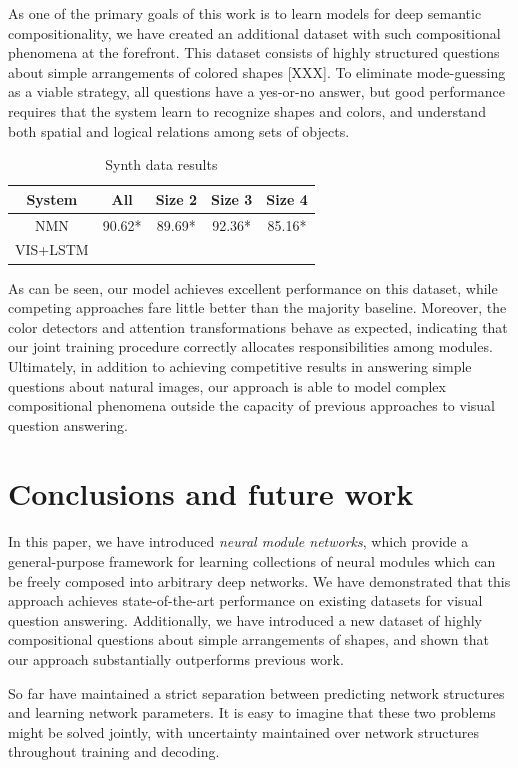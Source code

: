\documentclass[10pt,twocolumn,letterpaper]{article}
\begin{document}
As one of the primary goals of this work is to learn models for deep semantic
compositionality, we have created an additional dataset with such compositional
phenomena at the forefront. This dataset consists of highly structured questions
about simple arrangements of colored shapes [XXX]. To eliminate mode-guessing as
a viable strategy, all questions have a yes-or-no answer, but good performance
requires that the system learn to recognize shapes and colors, and understand
both spatial and logical relations among sets of objects.


\begin{table}[h]
  \footnotesize
  \center
  \begin{tabular}{ccccc}
    \toprule
    System & All & Size 2 & Size 3 & Size 4 \\
    \midrule
    NMN & 90.62* & 89.69* & 92.36* & 85.16* \\
    VIS+LSTM &  \\
    \bottomrule
  \end{tabular}
  \caption{Synth data results}
\end{table}

As can be seen, our model achieves excellent performance on this dataset, while
competing approaches fare little better than the majority baseline. Moreover,
the color detectors and attention transformations behave as expected, indicating
that our joint training procedure correctly allocates responsibilities among
modules. Ultimately, in addition to achieving competitive results in answering
simple questions about natural images, our approach is able to model complex
compositional phenomena outside the capacity of previous approaches to visual
question answering.

\section{Conclusions and future work}

In this paper, we have introduced \emph{neural module networks}, which provide a
general-purpose framework for learning collections of neural modules which can
be freely composed into arbitrary deep networks. We have demonstrated that this
approach achieves state-of-the-art performance on existing datasets for visual
question answering. Additionally, we have introduced a new dataset of highly
compositional questions about simple arrangements of shapes, and shown that our
approach substantially outperforms previous work.

So far have maintained a strict separation between predicting network
structures and learning network parameters. It is easy to imagine that these two
problems might be solved jointly, with uncertainty maintained over network
structures throughout training and decoding.
\end{document}
